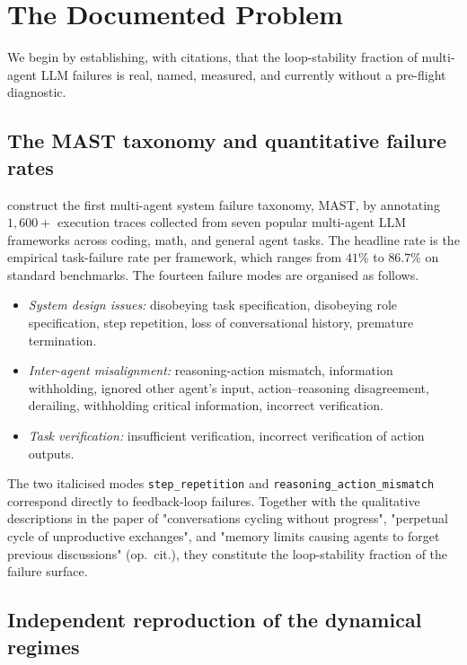 \documentclass[11pt,a4paper]{article}
\theoremstyle{definition}
\theoremstyle{remark}
\begin{document}
\section{The Documented Problem}\label{sec:problem}

We begin by establishing, with citations, that the loop-stability fraction
of multi-agent LLM failures is real, named, measured, and currently
without a pre-flight diagnostic.

\subsection{The MAST taxonomy and quantitative failure rates}

\citet{Cemri2025MAST} construct the first multi-agent system failure
taxonomy, MAST, by annotating $1{,}600+$ execution traces collected from
seven popular multi-agent LLM frameworks across coding, math, and general
agent tasks.  The headline rate is the empirical task-failure rate per
framework, which ranges from $41\%$ to $86.7\%$ on standard benchmarks.
The fourteen failure modes are organised as follows.

\begin{itemize}[leftmargin=*]
\item \emph{System design issues:}  disobeying task specification,
disobeying role specification, step repetition, loss of conversational
history, premature termination.
\item \emph{Inter-agent misalignment:} reasoning-action mismatch,
information withholding, ignored other agent's input, action--reasoning
disagreement, derailing, withholding critical information,
incorrect verification.
\item \emph{Task verification:} insufficient verification,
incorrect verification of action outputs.
\end{itemize}

The two italicised modes \texttt{step\_repetition} and
\texttt{reasoning\_action\_mismatch} correspond directly to feedback-loop
failures.  Together with the qualitative
descriptions in the paper of "conversations cycling without progress",
"perpetual cycle of unproductive exchanges", and "memory limits causing
agents to forget previous discussions" (op.~cit.), they constitute the
loop-stability fraction of the failure surface.

\subsection{Independent reproduction of the dynamical regimes}
\end{document}

